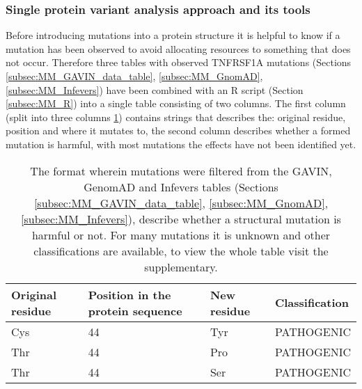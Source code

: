 	\subsubsection{Single protein variant analysis approach and its tools}
	Before introducing mutations into a protein structure it is helpful to know if a mutation has been observed to avoid allocating resources to something that does not occur. Therefore three tables with observed TNFRSF1A mutations (Sections \ref{subsec:MM_GAVIN_data_table}, \ref{subsec:MM_GnomAD}, \ref{subsec:MM_Infevers}) have been combined with an R script (Section \ref{subsec:MM_R}) into a single table consisting of two columns. The first column (split into three columns \ref{table:Res_Filtered_Mutations}) contains strings that describes the: original residue, position and where it mutates to, the second column describes whether a formed mutation is harmful, with most mutations the effects have not been identified yet. 
	\begin{table}[ht]
		\begin{tabular}{ l | l | l | l}
			Original residue & Position in the protein sequence & New residue & Classification\\ \hline
			Cys & 44 & Tyr & PATHOGENIC\\
			Thr & 44 & Pro & PATHOGENIC\\
			Thr & 44 & Ser & PATHOGENIC\\
		\end{tabular}
		\caption[Sample of combined tables with observed mutations]{The format wherein mutations were filtered from the GAVIN, GenomAD and Infevers tables (Sections \ref{subsec:MM_GAVIN_data_table},  \ref{subsec:MM_GnomAD}, \ref{subsec:MM_Infevers}),  describe whether a structural mutation is harmful or not. For many mutations it is unknown and other classifications are available, to view the whole table visit the supplementary.}
		\label{table:Res_Filtered_Mutations}
	\end{table}
	
